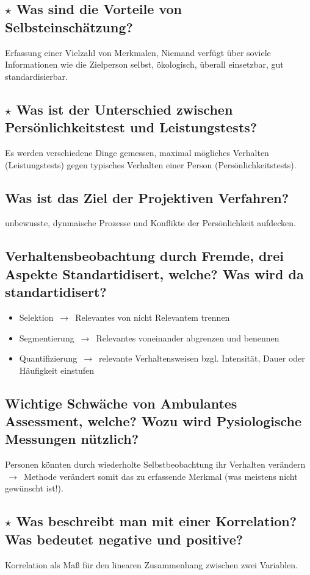 \documentclass[a4paper,9pt,DIV=14]{scrartcl}
\begin{document}
\subsection{$\star$ Was sind die Vorteile von Selbsteinschätzung?}%
    Erfassung einer Vielzahl von Merkmalen, Niemand verfügt über soviele Informationen wie die Zielperson selbst, ökologisch, überall einsetzbar, gut standardisierbar.
\subsection{$\star$ Was ist der Unterschied zwischen Persönlichkeitstest und Leistungstests?} %
    Es werden verschiedene Dinge gemessen, maximal mögliches Verhalten (Leistungstests) gegen typisches Verhalten einer Person (Persönlichkeitstests).
\subsection{Was ist das Ziel der Projektiven Verfahren?}
    unbewusste, dynmaische Prozesse und Konflikte der Persönlichkeit aufdecken.
\subsection{Verhaltensbeobachtung durch Fremde, drei Aspekte Standartidisert, welche? Was wird da standartidisert?}
    \begin{itemize}
    \item Selektion $\,\to\,$ Relevantes von nicht Relevantem trennen
    \item Segmentierung $\,\to\,$ Relevantes voneinander abgrenzen und benennen
    \item Quantifizierung $\,\to\,$ relevante Verhaltensweisen bzgl. Intensität, Dauer oder Häufigkeit einstufen
    \end{itemize}
\subsection{Wichtige Schwäche von Ambulantes Assessment, welche? Wozu wird Pysiologische Messungen nützlich?}
    Personen könnten durch wiederholte Selbstbeobachtung ihr Verhalten verändern $\,\to\,$ Methode verändert somit das zu erfassende Merkmal (was meistens nicht gewünscht ist!).
\subsection{$\star$ Was beschreibt man mit einer Korrelation? Was bedeutet negative und positive?} %
    Korrelation als Maß für den linearen Zusammenhang zwischen zwei Variablen.\\
\end{document}
